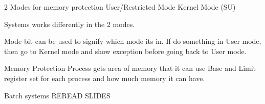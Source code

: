 \documentclass{article}
\begin{document}
	2 Modes for memory protection
		User/Restricted Mode
		Kernel Mode (SU)

		Systems works differently in the 2 modes.

		Mode bit can be used to signify which mode its in.
			If do something in User mode, then go to Kernel mode and show exception before going back to User mode.

	Memory Protection
		Process gets area of memory that it can use
		Base and Limit register set for each process and how much memory it can have. 

	Batch systems
		REREAD SLIDES
		
\end{document}
